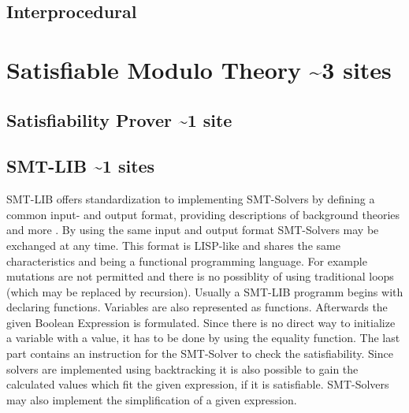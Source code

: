 \subsection{Interprocedural}
\section{Satisfiable Modulo Theory \textasciitilde 3 sites}
\subsection{Satisfiability Prover \textasciitilde 1 site}
\subsection{SMT-LIB \textasciitilde 1 sites}
SMT-LIB offers standardization to implementing SMT-Solvers by defining a common input- and output format, providing descriptions of background theories and more \cite{cokSMTLIBv2LanguageTools}. %
By using the same input and output format SMT-Solvers may be exchanged at any time. 
This format is LISP-like and shares the same characteristics and being a functional programming language. 
For example mutations are not permitted and there is no possiblity of using traditional loops (which may be replaced by recursion).
Usually a SMT-LIB programm begins with declaring functions. Variables are also represented as functions. 
Afterwards the given Boolean Expression is formulated. Since there is no direct way to initialize a variable with a value, it has to be done by using the equality function. 
The last part contains an instruction for the SMT-Solver to check the satisfiability. 
Since solvers are implemented using backtracking it is also possible to gain the calculated values which fit the given expression, if it is satisfiable. 
SMT-Solvers may also implement the simplification of a given expression.
